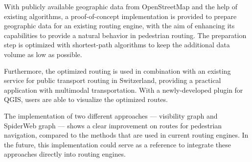 With publicly available geographic data from OpenStreetMap and the help of existing algorithms, a proof-of-concept implementation is provided to prepare geographic data for an existing routing engine, with the aim of enhancing its capabilities to provide a natural behavior in pedestrian routing. The preparation step is optimized with shortest-path algorithms to keep the additional data volume as low as possible.

Furthermore, the optimized routing is used in combination with an existing service for public transport routing in Switzerland, providing a practical application with multimodal transportation. With a newly-developed plugin for QGIS, users are able to visualize the optimized routes.

The implementation of two different approaches --- visibility graph and SpiderWeb graph --- shows a clear improvement on routes for pedestrian navigation, compared to the methods that are used in current routing engines. In the future, this implementation could serve as a reference to integrate these approaches directly into routing engines.